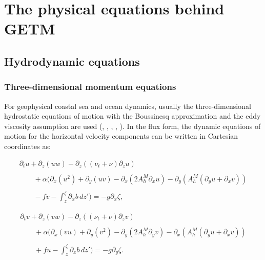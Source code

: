 \section{The physical equations behind GETM}

\subsection{Hydrodynamic equations}

\subsubsection{Three-dimensional momentum equations}\label{Section_3d_momentum}

For geophysical coastal sea 
and ocean dynamics, usually the three-dimensional hydrostatic equations
of motion with the Boussinesq approximation and the eddy 
viscosity assumption are used (\cite{BRYAN69}, \cite{COX84},
\cite{BLUMBERGea87}, \cite{HAIDVOGELea99}, \cite{KANTHAea00b}). 
In the flux form, the dynamic equations of motion for
the horizontal velocity components can be written in Cartesian
coordinates as:


\begin{equation}\label{uEq}
\begin{array}{l}
\displaystyle
\partial_t u
+\partial_z(uw)
-\partial_z\left((\nu_t+\nu) \partial_z u\right)
\\ \\ \displaystyle
\qquad+\alpha\bigg(\partial_x(u^2)+\partial_y(uv)
-\partial_x\left(2A_h^M\partial_xu\right)-\partial_y\left(A_h^M
(\partial_yu+\partial_xv)\right)
\\ \\ \displaystyle
\qquad
-fv
-\int_z^{\zeta}\partial_x b\,dz' \bigg)
=
- g\partial_x \zeta,
\end{array}
\end{equation}

\begin{equation}\label{vEq}
\begin{array}{l}
\displaystyle
\partial_t v +\partial_z(vw)
-\partial_z\left((\nu_t+\nu) \partial_z v\right)
\\ \\
\displaystyle
\qquad+\alpha\bigg(\partial_x(vu)+\partial_y(v^2)
-\partial_y\left(2A_h^M\partial_yv\right)-\partial_x\left(A_h^M
(\partial_yu+\partial_xv)\right)
\\ \\
\displaystyle
\qquad
+fu
-\int_z^{\zeta}\partial_x b\,dz' \bigg)=
- g\partial_y \zeta.
\end{array}
\end{equation}

